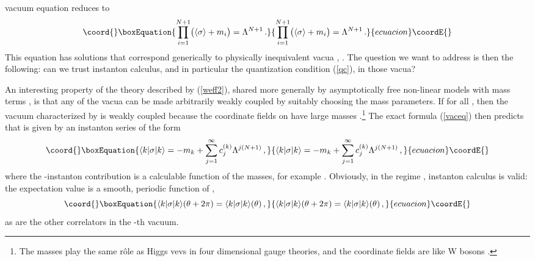 \documentclass[a4paper,12pt]{article}
\def\cpN{{\mathbb C}P^{N}}
\begin{document}
vacuum equation \coordHE{} reduces to
%
\begin{equation}\coord{}\boxEquation{
\label{vaceq}
\prod_{i=1}^{N+1} \bigl(\langle\sigma\rangle + m_{i}\bigr)
= \Lambda^{N+1}\, .
}{
\prod_{i=1}^{N+1} \bigl(\langle\sigma\rangle + m_{i}\bigr)
= \Lambda^{N+1}\, .
}{ecuacion}\coordE{}\end{equation}
%
This equation has \coordHE{} solutions that correspond generically
to \coordHE{} physically inequivalent vacua \coordHE{}, \coordHE{}.
The question we want to address is then the following:
can we trust instanton calculus, and in particular the 
quantization condition (\ref{qc}), in those vacua?

An interesting 
property of the theory described by (\ref{weff2}), shared more 
generally by asymptotically free
non-linear \myHighlight{$\sigma$}\coordHE{} models with mass terms \cite{neu}, 
is that any of the vacua can be made arbitrarily weakly coupled by 
suitably choosing the mass parameters. If 
\coordHE{} for all \coordHE{}, then the vacuum 
\coordHE{} characterized by \coordHE{} is 
weakly coupled because the coordinate fields on \myHighlight{$\cpN$}\coordHE{} 
have large masses \coordHE{}.\footnote{The masses \coordHE{} play the 
same r\^ole as Higgs vevs in four dimensional gauge theories, and the 
coordinate fields are like W bosons \cite{neu}.} The exact formula 
(\ref{vaceq}) then predicts that \coordHE{} is 
given by an instanton series of the form
%
\begin{equation}\coord{}\boxEquation{
\label{insser}
\langle k|\sigma |k\rangle = -m_{k} + \sum_{j=1}^{\infty} c_{j}^{(k)} 
\Lambda^{j(N+1)}\, ,
}{
\langle k|\sigma |k\rangle = -m_{k} + \sum_{j=1}^{\infty} c_{j}^{(k)} 
\Lambda^{j(N+1)}\, ,
}{ecuacion}\coordE{}\end{equation}
%
where the \coordHE{}-instanton contribution \coordHE{} is a calculable 
function of the masses, for example \coordHE{}. Obviously, in the regime \coordHE{}, instanton calculus is valid:
the expectation value \coordHE{} 
is a smooth, \myHighlight{$2\pi$}\coordHE{} periodic function of \myHighlight{$\theta$}\coordHE{},
%
\begin{equation}\coord{}\boxEquation{
\label{period}
\langle k|\sigma |k\rangle(\theta + 2\pi) = 
\langle k|\sigma |k\rangle(\theta)\, ,
}{
\langle k|\sigma |k\rangle(\theta + 2\pi) = 
\langle k|\sigma |k\rangle(\theta)\, ,
}{ecuacion}\coordE{}\end{equation}
%
as are the other correlators in the \coordHE{}-th vacuum. 
\end{document}
